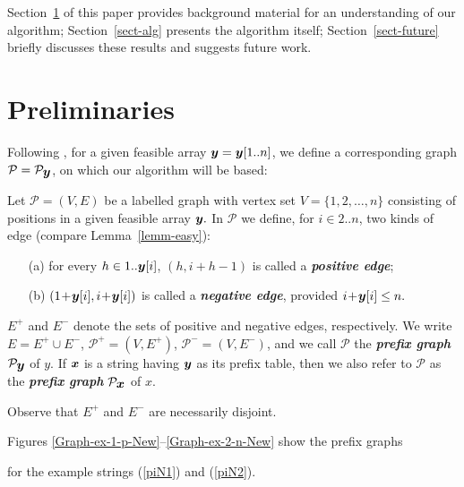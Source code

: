 \documentclass[runningheads,a4paper]{llncs}
\def\s#1{\mbox{\boldmath $#1$}}
\def\+{\!+\!}
\def\-{\!-\!}
\def\itbf#1{\textit{\textbf{#1}}}
\def\cP{\mathcal{P}}
\newif\ifRev
\begin{document}
Section~\ref{sect-prelim} of this paper provides background material
for an understanding of our algorithm;
Section~\ref{sect-alg} presents the algorithm itself;
Section~\ref{sect-future} briefly discusses these results
and suggests future work.

\section{Preliminaries}
\label{sect-prelim}
Following \cite{CRSW13}, for a given feasible array $\s{y} = \s{y}[1..n]$,
we define a corresponding graph $\cP = \cP_{\s{y}}$,
on which our algorithm will be based:

\ifRev
\begin{figure}[htbp]
\label{fig-assign}
  \begin{minipage}{0.5\linewidth}
  \centering
  \texttt{[image: ex-1-p]}
  \caption{$\mathcal{P}_{\s{y_1}}^+$ for $\s{y_1} = 80103010$}\label{Graph-ex-1-p}
  \end{minipage}
  \hfill
  \begin{minipage}{0.5\linewidth}
  \centering
  \texttt{[image: ex-1-n]}\\
  \caption{$\mathcal{P}_{\s{y_1}}^-$ for $\s{y_1} = 80103010$}\label{Graph-ex-1-n}
  \end{minipage}
\end{figure}
\fi

\begin{definition}
\label{defn-P}
Let $\mathcal{P} = (V,E)$ be a labelled graph with vertex set $V =
\{1,2,\ldots,n\}$ consisting of positions in a given feasible array
$\s{y}.$ In $\mathcal{P}$ we define, for $i \in 2..n$, two kinds of edge
(compare Lemma~\ref{lemm-easy}):
\begin{itemize}
\item[(a)]
for every $h \in 1..\s{y}[i]$, $(h,i\+ h\- 1)$ is called a \itbf{positive edge};
\item[(b)]
$(1\+ \s{y}[i],i\+ \s{y}[i])$ is called a \itbf{negative edge}, provided $i\+ \s{y}[i] \le n.$
\end{itemize}
$E^+$ and $ E^-$ denote the sets of positive and negative edges, respectively.  We write
$E = E^+ \cup E^-$, $\mathcal{P}^+ = (V,E^+)$,
$\mathcal{P}^- = (V,E^-)$,
and we call $\mathcal{P}$ the \itbf{prefix graph}
$\cP_{\s{y}}$ of \s{y}.
If $\s{x}$ is a string having $\s{y}$
as its prefix table,
then we also refer to $\mathcal{P}$ as the \itbf{prefix graph}
$\cP_{\s{x}}$ of \s{x}.
\end{definition}
Observe that $E^+$ and $E^-$ are necessarily disjoint.
\ifRev
Figures \ref{Graph-ex-1-p}--\ref{Graph-ex-2-n} show the prefix graphs,
as given in \cite{CRSW13}, for the example strings (\ref{pi1}) and (\ref{pi2}).
Again, in
\fi
Figures \ref{Graph-ex-1-p-New}--\ref{Graph-ex-2-n-New} show the prefix graphs
\ifRev of two different indeterminate
\fi
for the example strings (\ref{piN1}) and (\ref{piN2}).
\end{document}
